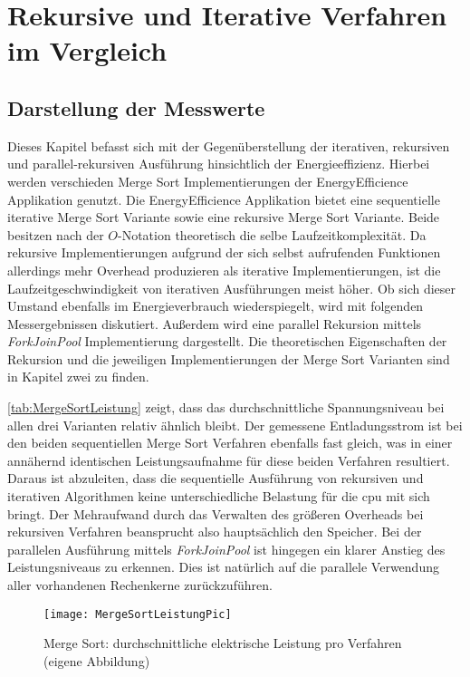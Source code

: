 \chapter{Rekursive und Iterative Verfahren im Vergleich}

\section{Darstellung der Messwerte}
Dieses Kapitel befasst sich mit der Gegenüberstellung der iterativen, rekursiven und parallel-rekursiven Ausführung hinsichtlich der Energieeffizienz. Hierbei werden verschieden Merge Sort Implementierungen der \glqq EnergyEfficience\grqq{} Applikation genutzt. Die \glqq EnergyEfficience\grqq{} Applikation bietet eine sequentielle iterative Merge Sort Variante sowie eine rekursive Merge Sort Variante. Beide besitzen nach der $O$-Notation theoretisch die selbe Laufzeitkomplexität. Da rekursive Implementierungen aufgrund der sich selbst aufrufenden Funktionen allerdings mehr Overhead produzieren als iterative Implementierungen, ist die Laufzeitgeschwindigkeit von iterativen Ausführungen meist höher. Ob sich dieser Umstand ebenfalls im Energieverbrauch wiederspiegelt, wird mit folgenden Messergebnissen diskutiert. Außerdem wird eine parallel Rekursion mittels \emph{ForkJoinPool} Implementierung dargestellt. Die theoretischen Eigenschaften der Rekursion und die jeweiligen Implementierungen der Merge Sort Varianten sind in Kapitel zwei zu finden.

\autoref{tab:MergeSortLeistung} zeigt, dass das durchschnittliche Spannungsniveau bei allen drei Varianten relativ ähnlich bleibt. Der gemessene Entladungsstrom ist bei den beiden sequentiellen Merge Sort Verfahren ebenfalls fast gleich, was in einer annähernd identischen Leistungsaufnahme für diese beiden Verfahren resultiert. Daraus ist abzuleiten, dass die sequentielle Ausführung von rekursiven und iterativen Algorithmen keine unterschiedliche Belastung für die \ac{cpu} mit sich bringt. Der Mehraufwand durch das Verwalten des größeren Overheads bei rekursiven Verfahren beansprucht also hauptsächlich den Speicher. Bei der parallelen Ausführung mittels \emph{ForkJoinPool} ist hingegen ein klarer Anstieg des Leistungsniveaus zu erkennen. Dies ist natürlich auf die parallele Verwendung aller vorhandenen Rechenkerne zurückzuführen.



\begin{figure}[H]
	\begin{center}	 
	\texttt{[image: MergeSortLeistungPic]}
	\caption{Merge Sort: durchschnittliche elektrische Leistung pro Verfahren (eigene Abbildung)}
	\label{fig:MergeSortLeistungPic} 
	\end{center}
\end{figure}

